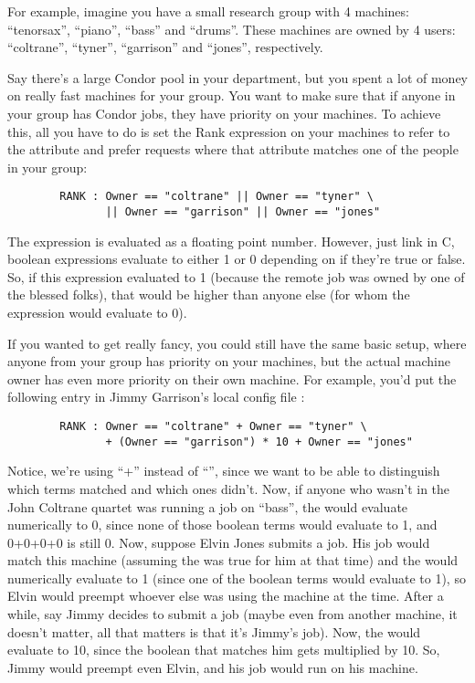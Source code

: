 For example, imagine you have a small research group with 4 machines:
``tenorsax'', ``piano'', ``bass'' and ``drums''.  These machines are
owned by 4 users: ``coltrane'', ``tyner'', ``garrison'' and ``jones'',
respectively.  

Say there's a large Condor pool in your department, but you spent a
lot of money on really fast machines for your group.  You want to make
sure that if anyone in your group has Condor jobs, they have priority
on your machines.  To achieve this, all you have to do is set the Rank
expression on your machines to refer to the  attribute and
prefer requests where that attribute matches one of the people in your
group:

\begin{verbatim}
        RANK : Owner == "coltrane" || Owner == "tyner" \
               || Owner == "garrison" || Owner == "jones"
\end{verbatim}

The  expression is evaluated as a floating point number.
However, just link in C, boolean expressions evaluate to either 1 or 0
depending on if they're true or false.  So, if this expression
evaluated to 1 (because the remote job was owned by one of the blessed
folks), that would be higher than anyone else (for whom the expression
would evaluate to 0).

If you wanted to get really fancy, you could still have the same basic
setup, where anyone from your group has priority on your machines, but
the actual machine owner has even more priority on their own machine.
For example, you'd put the following entry in Jimmy Garrison's local
config file \File{bass.local}:

\begin{verbatim}
        RANK : Owner == "coltrane" + Owner == "tyner" \
               + (Owner == "garrison") * 10 + Owner == "jones"
\end{verbatim}

Notice, we're using ``+'' instead of ``\Bar\Bar'', since we want to be able
to distinguish which terms matched and which ones didn't.  Now, if
anyone who wasn't in the John Coltrane quartet was running a job on
``bass'', the \Expr{RANK} would evaluate numerically to 0, since none
of those boolean terms would evaluate to 1, and 0+0+0+0 is still 0.
Now, suppose Elvin Jones submits a job.  His job would match this
machine (assuming the \Expr{START} was true for him at that time) and
the \Expr{RANK} would numerically evaluate to 1 (since one of the
boolean terms would evaluate to 1), so Elvin would preempt whoever
else was using the machine at the time.  After a while, say Jimmy
decides to submit a job (maybe even from another machine, it doesn't
matter, all that matters is that it's Jimmy's job).  Now, the
\Expr{RANK} would evaluate to 10, since the boolean that matches him
gets multiplied by 10.  So, Jimmy would preempt even Elvin, and his
job would run on his machine.

